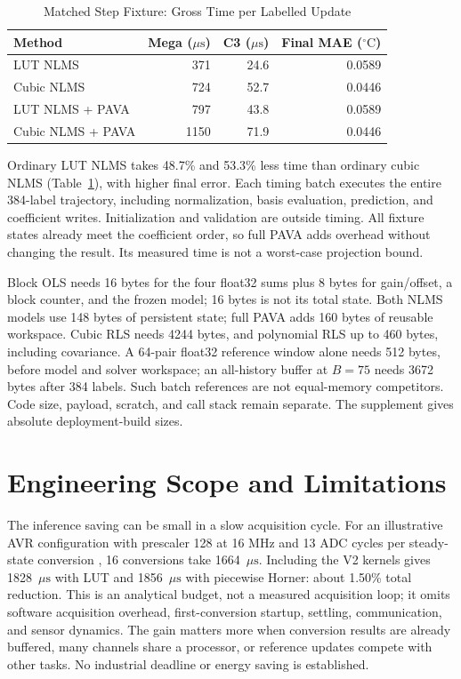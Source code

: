 \documentclass[journal,twoside,web]{ieeecolor}
\newcommand{\degC}{\ensuremath{^{\circ}\mathrm{C}}}
\newcommand{\us}{\ensuremath{\mu\mathrm{s}}}
\begin{document}
\begin{table}[t]
\caption{Matched Step Fixture: Gross Time per Labelled Update}
\label{tab:updates}\centering\footnotesize
\begin{tabular}{lrrr}\toprule
Method & Mega (\us{}) & C3 (\us{}) & Final MAE (\degC)\\\midrule
LUT NLMS &371&24.6&0.0589\\
Cubic NLMS &724&52.7&0.0446\\
LUT NLMS + PAVA &797&43.8&0.0589\\
Cubic NLMS + PAVA &1150&71.9&0.0446\\\bottomrule
\end{tabular}
\end{table}

Ordinary LUT NLMS takes 48.7\% and 53.3\% less time than ordinary cubic NLMS (Table~\ref{tab:updates}), with higher final error. Each timing batch executes the entire 384-label trajectory, including normalization, basis evaluation, prediction, and coefficient writes. Initialization and validation are outside timing. All fixture states already meet the coefficient order, so full PAVA adds overhead without changing the result. Its measured time is not a worst-case projection bound.

Block OLS needs 16 bytes for the four float32 sums plus 8 bytes for gain/offset, a block counter, and the frozen model; 16 bytes is not its total state. Both NLMS models use 148 bytes of persistent state; full PAVA adds 160 bytes of reusable workspace. Cubic RLS needs 4244 bytes, and polynomial RLS up to 460 bytes, including covariance. A 64-pair float32 reference window alone needs 512 bytes, before model and solver workspace; an all-history buffer at $B=75$ needs 3672 bytes after 384 labels. Such batch references are not equal-memory competitors. Code size, payload, scratch, and call stack remain separate. The supplement gives absolute deployment-build sizes.

\section{Engineering Scope and Limitations}
The inference saving can be small in a slow acquisition cycle. For an illustrative AVR configuration with prescaler 128 at 16 MHz and 13 ADC cycles per steady-state conversion \cite{adc}, 16 conversions take 1664~\us. Including the V2 kernels gives 1828~\us{} with LUT and 1856~\us{} with piecewise Horner: about 1.50\% total reduction. This is an analytical budget, not a measured acquisition loop; it omits software acquisition overhead, first-conversion startup, settling, communication, and sensor dynamics. The gain matters more when conversion results are already buffered, many channels share a processor, or reference updates compete with other tasks. No industrial deadline or energy saving is established.
\end{document}
